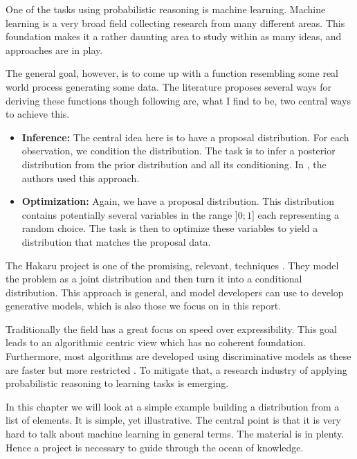 One of the tasks using probabilistic reasoning is machine learning.
Machine learning is a very broad field collecting research from many
different areas. This foundation makes it a rather daunting area to study within
as many ideas, and approaches are in play.

The general goal, however, is to come up with a function resembling some real world
process generating some data. The literature proposes several ways for deriving these
functions though following are, what I find to be, two central ways to achieve this.

\begin{itemize}
    \item \textbf{Inference:} The central idea here is to have a proposal
      distribution. For each observation, we condition the distribution.
      The task is to infer a posterior distribution from the prior
      distribution and all its conditioning. In \cite{Scibior:2015}, the
      authors used this approach.
    \item \textbf{Optimization:} Again, we have a proposal distribution.
      This distribution contains potentially several variables in the
      range $]0;1]$ each representing a random choice. The task is then to
      optimize these variables to yield a distribution that matches the
      proposal data.
\end{itemize}

The Hakaru project is one of the promising, relevant, techniques \cite{NarayananCRSZ16}.
They model the problem as a joint
distribution and then turn it into a conditional distribution. This approach is general,
and model developers can use to develop generative models, which is also those we focus on in this
report.

Traditionally the field has a great focus on speed over expressibility.
This goal leads to an algorithmic centric view which has no coherent
foundation. Furthermore, most algorithms are developed using discriminative
models as these are faster but more restricted \cite{Ng:2002}.
To mitigate that, a research industry of applying probabilistic
reasoning to learning tasks is emerging.

In this chapter we will look at a simple example building a distribution
from a list of elements. It is simple, yet illustrative. The central point
is that it is very hard to talk about machine learning in general terms.
The material is in plenty. Hence a project is necessary
to guide through the ocean of knowledge.


